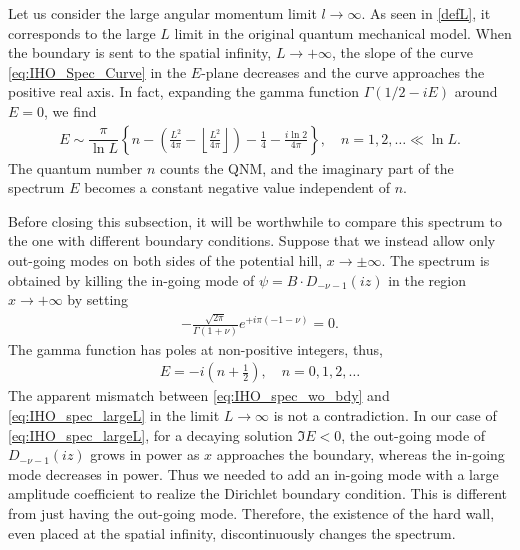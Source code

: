 \documentclass[a4paper,11pt]{article}
\begin{document}
Let us consider the large angular momentum limit $l\to\infty$. 
As seen in \eqref{defL}, it corresponds to the large $L$ limit in the original quantum mechanical model.
When the boundary is sent to the spatial infinity, $L\rightarrow+\infty$, 
the slope of the curve \eqref{eq:IHO_Spec_Curve} in the $E$-plane decreases and the curve approaches the positive real axis. 
In fact, expanding the gamma function $\Gamma(1/2-iE)$ around $E=0$,
we find
\begin{align}
    \label{eq:IHO_spec_largeL}
    E\sim
    \dfrac{\pi}{\ln L}
    \left\{
        n -\left(
            \frac{L^2}{4\pi} - \left\lfloor\frac{L^2}{4\pi}\right\rfloor
        \right) -\frac{1}{4}
        -\frac{i\ln 2}{4\pi}
    \right\}, \quad
    n= 1,2,\dots \ll \ln L.
\end{align}
The quantum number $n$ counts the QNM, and the imaginary part of the spectrum $E$ becomes a constant negative value independent of $n$.


Before closing this subsection,
it will be worthwhile to compare this spectrum to the one with different boundary conditions.
Suppose that we instead allow only out-going modes on both sides of the potential hill, $x\rightarrow\pm\infty$.
The spectrum is obtained by killing the in-going mode of $\psi = B\cdot D_{-\nu-1}(iz)$ in the region $x\rightarrow+\infty$ by setting
\begin{align}
    -\frac{\sqrt{2\pi}}{\Gamma(1+\nu)}e^{+i\pi(-1-\nu)} = 0.
\end{align}
The gamma function has poles at non-positive integers, thus,
\begin{align}
    \label{eq:IHO_spec_wo_bdy}
    E
    = -i\left(n+\frac{1}{2}\right), \quad
    n=0,1,2,\dots
\end{align}
The apparent mismatch between \eqref{eq:IHO_spec_wo_bdy} and \eqref{eq:IHO_spec_largeL} in the limit $L\rightarrow\infty$ is not a contradiction.
In our case of \eqref{eq:IHO_spec_largeL},
for a decaying solution $\Im E<0$,
the out-going mode of $D_{-\nu-1}(iz)$ grows in power as $x$ approaches the boundary,
whereas the in-going mode decreases in power.
Thus we needed to add an in-going mode with a large amplitude coefficient to realize the Dirichlet boundary condition.
This is different from just having the out-going mode. Therefore, the existence of the hard wall, even placed at the spatial infinity, discontinuously changes the spectrum.
\end{document}
